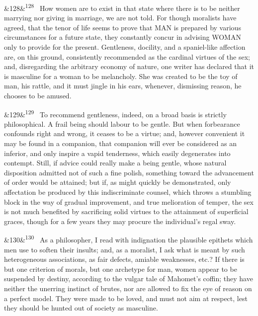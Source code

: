 \documentclass[12pt]{article}
\newcommand{\para}[1][]{\par\noindent\ifx&#1&\else\textsuperscript{\footnotesize #1}~\fi}
\begin{document}
\para[128] How women are to exist in that state where there is to be neither marrying nor giving in marriage, we are not told. For though moralists have agreed, that the tenor of life seems to prove that MAN is prepared by various circumstances for a future state, they constantly concur in advising WOMAN only to provide for the present. Gentleness, docility, and a spaniel-like affection are, on this ground, consistently recommended as the cardinal virtues of the sex; and, disregarding the arbitrary economy of nature, one writer has declared that it is masculine for a woman to be melancholy. She was created to be the toy of man, his rattle, and it must jingle in his ears, whenever, dismissing reason, he chooses to be amused.

\para[129] To recommend gentleness, indeed, on a broad basis is strictly philosophical. A frail being should labour to be gentle. But when forbearance confounds right and wrong, it ceases to be a virtue; and, however convenient it may be found in a companion, that companion will ever be considered as an inferior, and only inspire a vapid tenderness, which easily degenerates into contempt. Still, if advice could really make a being gentle, whose natural disposition admitted not of such a fine polish, something toward the advancement of order would be attained; but if, as might quickly be demonstrated, only affectation be produced by this indiscriminate counsel, which throws a stumbling block in the way of gradual improvement, and true melioration of temper, the sex is not much benefited by sacrificing solid virtues to the attainment of superficial graces, though for a few years they may procure the individual's regal sway.

\para[130] As a philosopher, I read with indignation the plausible epithets which men use to soften their insults; and, as a moralist, I ask what is meant by such heterogeneous associations, as fair defects, amiable weaknesses, etc.? If there is but one criterion of morals, but one archetype for man, women appear to be suspended by destiny, according to the vulgar tale of Mahomet's coffin; they have neither the unerring instinct of brutes, nor are allowed to fix the eye of reason on a perfect model. They were made to be loved, and must not aim at respect, lest they should be hunted out of society as masculine.
\end{document}
